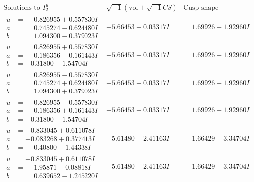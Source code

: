 \documentclass[1p]{elsarticle_modified}
\theoremstyle{definition}
\newcommand{\I}{\sqrt{-1}}
\begin{document}
$$\begin{array}{c|c|c}  
\text{Solutions to }I^u_{2}& \I (\text{vol} + \sqrt{-1}CS) & \text{Cusp shape}\\
 \hline 
\begin{aligned}
u &= \phantom{-}0.826955 + 0.557830 I \\
a &= \phantom{-}0.745274 - 0.624480 I \\
b &= \phantom{-}1.094300 - 0.379023 I\end{aligned}
 & -5.66453 + 0.03317 I & \phantom{-}1.69926 - 1.92960 I \\ \hline\begin{aligned}
u &= \phantom{-}0.826955 + 0.557830 I \\
a &= \phantom{-}0.186356 - 0.161443 I \\
b &= -0.31800 + 1.54704 I\end{aligned}
 & -5.66453 + 0.03317 I & \phantom{-}1.69926 - 1.92960 I \\ \hline\begin{aligned}
u &= \phantom{-}0.826955 - 0.557830 I \\
a &= \phantom{-}0.745274 + 0.624480 I \\
b &= \phantom{-}1.094300 + 0.379023 I\end{aligned}
 & -5.66453 - 0.03317 I & \phantom{-}1.69926 + 1.92960 I \\ \hline\begin{aligned}
u &= \phantom{-}0.826955 - 0.557830 I \\
a &= \phantom{-}0.186356 + 0.161443 I \\
b &= -0.31800 - 1.54704 I\end{aligned}
 & -5.66453 - 0.03317 I & \phantom{-}1.69926 + 1.92960 I \\ \hline\begin{aligned}
u &= -0.833045 + 0.611078 I \\
a &= -0.083268 + 0.377413 I \\
b &= \phantom{-}0.40800 + 1.44338 I\end{aligned}
 & -5.61480 - 2.41163 I & \phantom{-}1.66429 + 3.34704 I \\ \hline\begin{aligned}
u &= -0.833045 + 0.611078 I \\
a &= \phantom{-}1.95871 + 0.08818 I \\
b &= \phantom{-}0.639652 - 1.245220 I\end{aligned}
 & -5.61480 - 2.41163 I & \phantom{-}1.66429 + 3.34704 I \\ \hline\begin{aligned}

\end{aligned}
\end{array}$$
\end{document}
